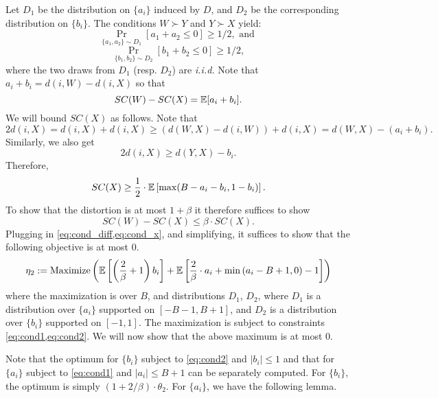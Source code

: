 Let $D_1$ be the distribution on $\{a_i\}$ induced by $D$, and $D_2$ be the corresponding distribution on $\{b_i\}$.  The conditions $W \succ Y$ and $Y \succ X$ yield:
\begin{equation}
\label{eq:cond1}
\Pr_{\{a_1,a_2\} \sim D_1} \left[ a_1 + a_2 \le 0 \right] \ge 1/2, \mbox{ and }
\end{equation}
\begin{equation}
\label{eq:cond2}
\Pr_{\{b_1,b_2\} \sim D_2} \left[ b_1 + b_2 \le 0 \right] \ge 1/2,
\end{equation}
where the two draws from $D_1$ (resp. $D_2$) are {\em i.i.d.} Note that $a_i + b_i = d(i,W) - d(i,X)$ so that 
\begin{equation}
\label{eq:cond_diff}
    SC(W) - SC(X) = \mathbb{E}[a_i + b_i].
\end{equation}
We will bound $SC(X)$ as follows. Note that
$$2 d(i,X) = d(i,X) + d(i,X) \ge (d(W,X) - d(i,W)) + d(i,X) = d(W,X) - (a_i + b_i).$$  
Similarly, we also get 
$$2 d(i,X) \ge d(Y,X) - b_i.$$
Therefore, 
\begin{equation}
\label{eq:cond_x}
    SC(X) \ge \frac{1}{2} \cdot  \mathbb{E}\left[\max ( B - a_i - b_i, 1 - b_i) \right].
\end{equation}
To show that the distortion is at most $1+\beta$ it therefore suffices to show
$$ SC(W) - SC(X) \le \beta \cdot SC(X).$$
Plugging in \cref{eq:cond_diff,eq:cond_x}, and simplifying, it suffices to show that the following objective is at most $0$.
\begin{equation}
\label{eq:obj4}
\eta_2 := \mbox{Maximize} \left( \mathbb{E}\left[\left(\frac{2}{\beta} + 1 \right) b_i \right] + \mathbb{E}\left[ \frac{2}{\beta} \cdot a_i +  \min\left( a_i - B + 1,  0 \right) -1\right] \right)
\end{equation}
where the maximization is over $B$, and  distributions $D_1$, $D_2$, where $D_1$ is a distribution over $\{a_i\}$ supported on $[-B-1,B+1]$, and $D_2$ is a distribution over $\{b_i\}$ supported on $[-1,1]$. The maximization is subject to constraints \cref{eq:cond1,eq:cond2}. We will now show that the above maximum is at most $0$.

Note that the optimum for $\{b_i\}$ subject to \cref{eq:cond2} and $|b_i| \le 1$ and that for $\{a_i\}$ subject to \cref{eq:cond1} and $|a_i| \le B+1$ can be separately computed. For $\{b_i\}$, the optimum is simply $(1 + 2/\beta) \cdot \theta_2$. For $\{a_i\}$, we have the following lemma.

